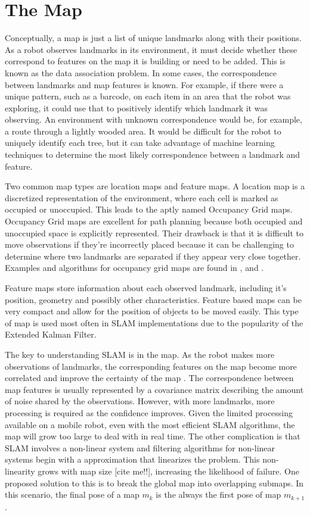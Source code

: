\documentclass[12pt]{article}
\begin{document}
\section{The Map}

Conceptually, a map is just a list of unique landmarks along with their positions.  As a robot observes landmarks in its environment, it must decide whether these correspond to features on the map it is building or need to be added.  This is known as the data association problem.  In some cases, the correspondence between landmarks and map features is known.  For example, if there were a unique pattern, such as a barcode, on each item in an area that the robot was exploring, it could use that to positively identify which landmark it was observing.  An environment with unknown correspondence would be, for example, a route through a lightly wooded area.  It would be difficult for the robot to uniquely identify each tree, but it can take advantage of machine learning techniques to determine the most likely correspondence between a landmark and feature.

Two common map types are location maps and feature maps.  A location map is a discretized representation of the environment, where each cell is marked as occupied or unoccupied.  This leads to the aptly named Occupancy Grid maps. Occupancy Grid maps are excellent for path planning because both occupied and unoccupied space is explicitly represented.  Their drawback is that it is difficult to move observations if they’re incorrectly placed because it can be challenging to determine where two landmarks are separated if they appear very close together.   Examples and algorithms for occupancy grid maps are found in \cite{ThrunPR2005}, \cite{lee2007feature} and \cite{eliazar2004dp}.  

Feature maps store information about each observed landmark, including it’s position, geometry and possibly other characteristics.  Feature based maps can be very compact and allow for the position of objects to be moved easily.  This type of map is used most often in SLAM implementations due to the popularity of the Extended Kalman Filter.  

The key to understanding SLAM is in the map.  As the robot makes more observations of landmarks, the corresponding features on the map become more correlated and improve the certainty of the map \cite{durrant2006simultaneous}.  The correspondence between map features is usually represented by a covariance matrix describing the amount of noise shared by the observations. However, with more landmarks, more processing is required as the confidence improves.  Given the limited processing available on a mobile robot, even with the most efficient SLAM algorithms, the map will grow too large to deal with in real time.  The other complication is that SLAM involves a non-linear system and filtering algorithms for non-linear systems begin with a approximation that linearizes the problem.  This non-linearity grows with map size [cite me!!], increasing the likelihood of failure.  One proposed solution to this is to break the global map into overlapping submaps.  In this scenario, the final pose of a map $m_{k}$ is the always the first pose of map $m_{k+1}$.  
\end{document}
